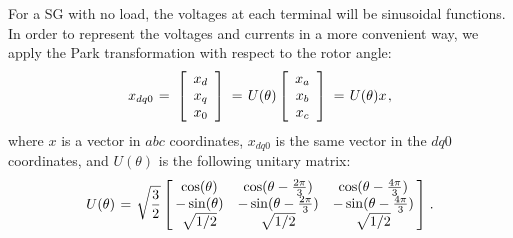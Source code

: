 \documentclass[letterpaper,10pt,conference]{ieeeconf}
\newcommand{\m}      {{\hbox{\hskip 1pt}}}
\newcommand{\nm}     {{\hbox{\hskip -3pt}}}
\begin{document}
For a SG with no load, the voltages at each terminal
will be sinusoidal functions. In order to represent the voltages and
currents in a more convenient way, we apply the Park transformation
with respect to the rotor angle:
$$ x_{dq0} \m=\m \left[\begin{array}{c} x_{d}\\ x_{q}\\ x_{0}
   \end{array}\right] \m=\m U(\theta) \left[\begin{array}{c} x_{a}\\
   x_b\\ x_c\end{array}\right] \m=\m U(\theta) x \m,$$
where $x$ is a vector in $abc$ coordinates, $x_{dq0}$
is the same vector in the $dq0$ coordinates, and $U(\theta)$ is the
following unitary matrix:
$$ U(\theta) \m=\m \sqrt{\frac{3}{2}}\left[\nm\begin{array}{ccc}
   \cos(\theta) & \cos(\theta-\frac{2\pi}{3}) & \cos(\theta-
   \frac{4\pi}{3})\\ -\sin(\theta) & -\sin(\theta-\frac{2\pi}{3})
   & -\sin(\theta-\frac{4\pi}{3})\\ \sqrt{1/2} & \sqrt{1/2} & 
   \sqrt{1/2} \end{array}\nm\right] \m.$$
\end{document}
